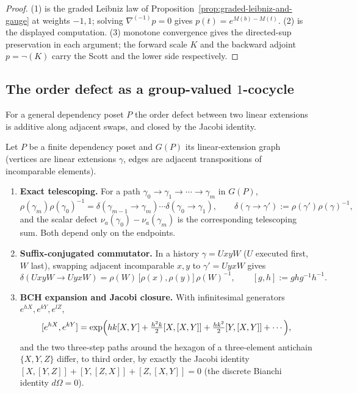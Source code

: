\begin{proof}
(1) is the graded Leibniz law of
Proposition~\ref{prop:graded-leibniz-and-gauge} at weights $-1,1$; solving
$\nabla^{(-1)}p=0$ gives $p(t)=e^{M(b)-M(t)}$.  (2) is the displayed
computation.  (3) monotone convergence gives the directed-sup preservation in
each argument; the forward scale $K$ and the backward adjoint $p=\neg(K)$ carry
the Scott and the lower side respectively.
\end{proof}

\subsection{The order defect as a group-valued $1$-cocycle}

For a general dependency poset $P$ the order defect between two linear
extensions is additive along adjacent swaps, and closed by the Jacobi identity.

\begin{theorem}
\label{thm:defect-group-1-cocycle}
Let $P$ be a finite dependency poset and $G(P)$ its linear-extension graph
(vertices are linear extensions $\gamma$, edges are adjacent transpositions of
incomparable elements).
\begin{enumerate}
  \item \textbf{Exact telescoping.} For a path
  $\gamma_0\to\gamma_1\to\cdots\to\gamma_m$ in $G(P)$,
  \[
    \rho(\gamma_m)\rho(\gamma_0)^{-1}
    =\delta(\gamma_{m-1}\to\gamma_m)\cdots\delta(\gamma_0\to\gamma_1),
    \qquad
    \delta(\gamma\to\gamma'):=\rho(\gamma')\rho(\gamma)^{-1},
  \]
  and the scalar defect $\nu_a(\gamma_0)-\nu_a(\gamma_m)$ is the corresponding
  telescoping sum.  Both depend only on the endpoints.
  \item \textbf{Suffix-conjugated commutator.} In a history $\gamma=UxyW$ ($U$
  executed first, $W$ last), swapping adjacent incomparable $x,y$ to
  $\gamma'=UyxW$ gives
  \[
    \delta(UxyW\to UyxW)=\rho(W)\,\bigl[\rho(x),\rho(y)\bigr]\,\rho(W)^{-1},
    \qquad
    [g,h]:=ghg^{-1}h^{-1} .
  \]
  \item \textbf{BCH expansion and Jacobi closure.} With infinitesimal
  generators $e^{hX},e^{kY},e^{lZ}$,
  \[
    [e^{hX},e^{kY}]
    =\exp\Bigl(hk[X,Y]+\tfrac{h^2k}{2}[X,[X,Y]]+\tfrac{hk^2}{2}[Y,[X,Y]]+\cdots\Bigr),
  \]
  and the two three-step paths around the hexagon of a three-element antichain
  $\{X,Y,Z\}$ differ, to third order, by exactly the Jacobi identity
  $[X,[Y,Z]]+[Y,[Z,X]]+[Z,[X,Y]]=0$ (the discrete Bianchi identity
  $d\Omega=0$).
\end{enumerate}
\end{theorem}

